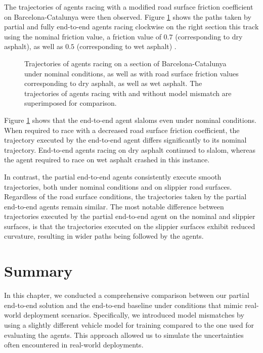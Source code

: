 The trajectories of agents racing with a modified road surface friction coefficient on Barcelona-Catalunya were then observed. 
Figure \ref{fig:mu_lap} shows the paths taken by partial and fully end-to-end agents racing clockwise on the right section this track using the nominal friction value, a friction value of $0.7$ (corresponding to dry asphalt), as well as $0.5$ (corresponding to wet asphalt) \cite{Novikov2018}.

\begin{figure}[htb!]
    \centering
    
    \caption[Trajectories of agents racing with a decreased road surface friction coefficient]{Trajectories of agents racing on a section of Barcelona-Catalunya under nominal conditions, as well as with road surface friction values corresponding to dry asphalt, as well as wet asphalt. The trajectories of agents racing with and without model mismatch are superimposed for comparison.}
    \label{fig:mu_lap}
\end{figure}


Figure \ref{fig:mu_lap} shows that the end-to-end agent slaloms even under nominal conditions.
When required to race with a decreased road surface friction coefficient, the trajectory executed by the end-to-end agent differs significantly to its nominal trajectory.
End-to-end agents racing on dry asphalt continued to slalom, whereas the agent required to race on wet asphalt crashed in this instance.

In contrast, the partial end-to-end agents consistently execute smooth trajectories, both under nominal conditions and on slippier road surfaces. 
Regardless of the road surface conditions, the trajectories taken by the partial end-to-end agents remain similar. 
The most notable difference between trajectories executed by the partial end-to-end agent on the nominal and slippier surfaces, is that the trajectories executed on the slippier surfaces exhibit reduced curvature, resulting in wider paths being followed by the agents.


\section{Summary}

In this chapter, we conducted a comprehensive comparison between our partial end-to-end solution and the end-to-end baseline under conditions that mimic real-world deployment scenarios. 
Specifically, we introduced model mismatches by using a slightly different vehicle model for training compared to the one used for evaluating the agents. 
This approach allowed us to simulate the uncertainties often encountered in real-world deployments.


